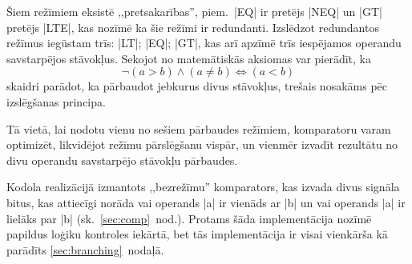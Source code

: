 	Šiem režīmiem eksistē ,,pretsakarības'', piem.~|EQ| ir pretējs |NEQ| un
	|GT| pretējs |LTE|, kas nozīmē ka šie režīmi ir redundanti. Izslēdzot
	redundantos režīmus iegūstam trīs: |LT|; |EQ|; |GT|, kas arī apzīmē
	trīs iespējamos operandu savstarpējos stāvokļus.
	Sekojot no matemātiskās aksiomas var pierādīt, ka
	\[
		\neg (a>b) \land (a \neq b) \iff (a<b)
	\]
	skaidri parādot, ka pārbaudot jebkurus divus stāvokļus, trešais
	nosakāms pēc izslēgšanas principa.
	\pagebreak[3]
	
	Tā vietā, lai nodotu vienu no sešiem pārbaudes režīmiem, komparatoru
	varam optimizēt, likvidējot režīmu pārslēgšanu vispār, un vienmēr izvadīt
	rezultātu no divu operandu savstarpējo stāvokļu pārbaudes.
	
	Kodola realizācijā izmantots ,,bezrežīmu'' komparators, kas 
	izvada divus signāla bitus, kas attiecīgi norāda 
	vai operands |a| ir vienāds ar |b| 
	un vai operands |a| ir lielāks par |b| (sk.~\ref{sec:comp}~nod.).
	Protams šāda implementācija nozīmē papildus loģiku kontroles iekārtā,
	bet tās implementācija ir visai vienkārša kā parādīts
	\ref{sec:branching}~nodaļā.

